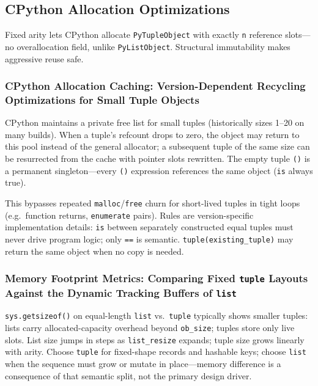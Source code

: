 \documentclass[a4paper,twoside]{report}
\begin{document}
\subsection{CPython Allocation Optimizations}

Fixed arity lets CPython allocate \texttt{PyTupleObject} with exactly \texttt{n} reference slots---no overallocation field, unlike \texttt{PyListObject}. Structural immutability makes aggressive reuse safe.

\subsubsection{CPython Allocation Caching: Version-Dependent Recycling Optimizations for Small Tuple Objects}

CPython maintains a private free list for small tuples (historically sizes 1--20 on many builds). When a tuple's refcount drops to zero, the object may return to this pool instead of the general allocator; a subsequent tuple of the same size can be resurrected from the cache with pointer slots rewritten. The empty tuple \texttt{()} is a permanent singleton---every \texttt{()} expression references the same object (\texttt{is} always true).

This bypasses repeated \texttt{malloc}/\texttt{free} churn for short-lived tuples in tight loops (e.g.\ function returns, \texttt{enumerate} pairs). Rules are version-specific implementation details: \texttt{is} between separately constructed equal tuples must never drive program logic; only \texttt{==} is semantic. \texttt{tuple(existing\_tuple)} may return the same object when no copy is needed.

\subsubsection{Memory Footprint Metrics: Comparing Fixed \texttt{tuple} Layouts Against the Dynamic Tracking Buffers of \texttt{list}}

\texttt{sys.getsizeof()} on equal-length \texttt{list} vs.\ \texttt{tuple} typically shows smaller tuples: lists carry allocated-capacity overhead beyond \texttt{ob\_size}; tuples store only live slots. List size jumps in steps as \texttt{list\_resize} expands; tuple size grows linearly with arity. Choose \texttt{tuple} for fixed-shape records and hashable keys; choose \texttt{list} when the sequence must grow or mutate in place---memory difference is a consequence of that semantic split, not the primary design driver.
\end{document}
